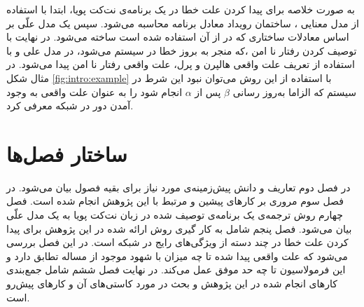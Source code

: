 به صورت خلاصه برای پیدا کردن علت خطا در یک برنامه‌ی نت‌کت پویا، ابتدا با استفاده از مدل‌ معنایی
، ساختمان رویداد معادل برنامه محاسبه می‌شود. 
سپس یک مدل علّی%
 بر اساس معادلات ساختاری%
که در 
\cite{hp}
از آن استفاده شده است ساخته می‌شود.
در نهایت با توصیف کردن رفتار نا امن%
،که منجر به بروز خطا در سیستم می‌شود، در مدل علی و با استفاده از تعریف علت واقعی هالپرن و پرل، علت واقعی رفتار نا امن پیدا می‌شود.
در مثال شکل 
\ref{fig:intro:example}
با استفاده از این روش می‌توان نبود این شرط در سیستم که الزاما به‌روز رسانی 
$\beta$
پس از 
$\alpha$
انجام شود را به عنوان علت واقعی به وجود آمدن دور در شبکه معرفی کرد.

\section{ساختار فصل‌ها}
در فصل دوم تعاریف و دانش پیش‌زمینه‌ی مورد نیاز برای بقیه فصول 
بیان می‌شود.
 در فصل سوم مروری بر کار‌های پیشین و مرتبط با این پژوهش انجام شده است.
فصل چهارم روش ترجمه‌ی یک برنامه‌ی توصیف شده در زبان نت‌کت پویا به یک مدل علّی%
بیان می‌شود.
فصل پنجم شامل به کار گیری روش ارائه شده در این پژوهش برای پیدا کردن علت خطا در چند دسته از ویژگی‌های رایج در شبکه است. در این فصل بررسی می‌شود که علت واقعی پیدا شده تا چه میزان با شهود موجود از مساله تطابق دارد و این فرمولاسیون تا چه حد موفق عمل می‌کند.
در نهایت فصل ششم شامل جمع‌بندی کار‌های انجام شده در این پژوهش و بحث در مورد کاستی‌های آن و کار‌های پیش‌رو است.

